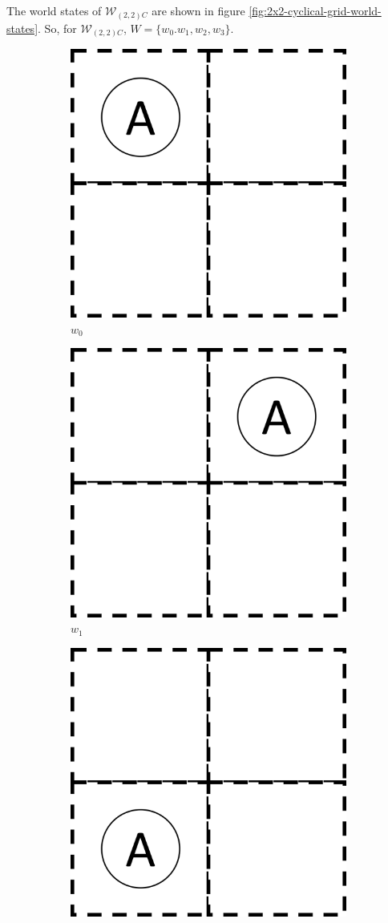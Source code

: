 The world states of $\mathscr{W}_{(2,2)C}$ are shown in figure \ref{fig:2x2-cyclical-grid-world-states}.
So, for $\mathscr{W}_{(2,2)C}$, $W = \{ w_{0}. w_{1}, w_{2}, w_{3} \}$.
\begin{figure}[H]
    \centering
    \begin{subfigure}[b]{0.45\linewidth}
        \centering
        \includegraphics[width=0.5\linewidth]{2MathematicalFramework/InitialFramework/Images/2x2_no_walls_world_states/w0.png}
        \caption{$w_{0}$}
        \vspace{0.25cm}
    \end{subfigure}
    \begin{subfigure}[b]{0.45\linewidth}
        \centering
        \includegraphics[width=0.5\linewidth]{2MathematicalFramework/InitialFramework/Images/2x2_no_walls_world_states/w1.png}
        \caption{$w_{1}$}
        \vspace{0.25cm}
    \end{subfigure}
    \begin{subfigure}[b]{0.45\linewidth}
        \centering
        \includegraphics[width=0.5\linewidth]{2MathematicalFramework/InitialFramework/Images/2x2_no_walls_world_states/w2.png}

\end{subfigure}
\end{figure}

